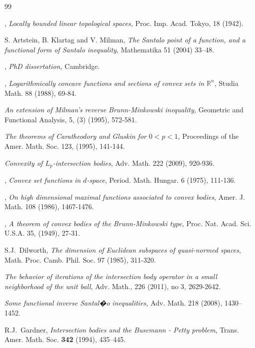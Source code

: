 \documentclass[12pt]{amsart} %
\renewcommand{\[}{\left[}
\renewcommand{\(}{\left(}
\renewcommand{\]}{\right]}
\renewcommand{\)}{\right)}
\newcommand{\R}{\mathbb R}              %
\begin{document}
\begin{thebibliography}{99}

, {\em Locally bounded linear topological spaces,} Proc. Imp. Acad. Tokyo, 18 (1942).


 {\sc S. Artstein, B. Klartag and V. Milman}, {\em The Santalo point of a function, and a functional form of Santalo inequality}, Mathematika 51 (2004) 33--48.


, {\em PhD dissertation,}  Cambridge.


, {\em Logarithmically  concave functions and sections of convex sets in $\R^n$}, Studia  Math. 88 (1988), 69-84.

 {\em An extension of Milman's reverse Brunn-Minkowski inequality,}  Geometric and Functional Analysis, 5, (3) (1995), 572-581.

 {\em The theorems of Caratheodory and Gluskin for $0<p<1$}, Proceedings of the Amer. Math. Soc. 123, (1995), 141-144.

  {\em Convexity of $L_p$-intersection bodies},  Adv. Math. 222 (2009), 920-936.

,  {\em  Convex set functions in $d$-space}, Period. Math. Hungar. 6 (1975), 111-136.


,  {\em  On high dimensional maximal functions associated to convex bodies}, Amer. J. Math. 108 (1986), 1467-1476.


,  {\em A theorem of convex bodies of the Brunn-Minkowski type,}
Proc. Nat. Acad. Sci. U.S.A.  35, (1949), 27-31.

 {\sc S.J.~Dilworth},
{\em The dimension of Euclidean subspaces of quasi-normed spaces},
Math. Proc. Camb. Phil. Soc. 97 (1985), 311-320.


   {\em The behavior of iterations of the intersection body operator in a small neighborhood of the unit ball}, Adv. Math., 226 (2011), no 3, 2629-2642.

  {\it Some functional inverse
Santal�o inequalities,} Adv. Math. 218 (2008), 1430--1452.

 {\sc R.J.~Gardner}, {\em Intersection bodies and
the Busemann - Petty problem}, Trans. Amer. Math. Soc. {\bf 342}
(1994), 435--445.


\end{thebibliography}
\end{document}
